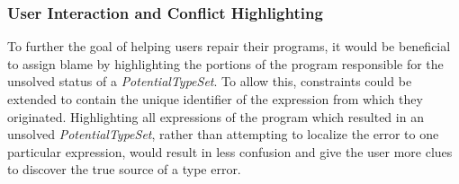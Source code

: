 \subsubsection{User Interaction and Conflict Highlighting}
To further the goal of helping users repair their programs, it would be beneficial to assign blame by highlighting the portions of the program responsible for the unsolved status of a \textit{PotentialTypeSet}. To allow this, constraints could be extended to contain the unique identifier of the expression from which they originated. Highlighting all expressions of the program which resulted in an unsolved \textit{PotentialTypeSet}, rather than attempting to localize the error to one particular expression, would result in less confusion and give the user more clues to discover the true source of a type error.



